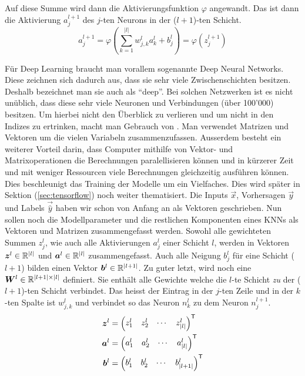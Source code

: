 Auf diese Summe wird dann die Aktivierungsfunktion $\varphi$ angewandt.
Das ist dann die Aktivierung $a_j^{l+1}$ des $j$-ten Neurons in der ($l+1$)-ten Schicht.
\\
\begin{equation}\tag{FP2}\label{eq:aktivierung_normal}
  a_j^{l+1} = \varphi\left(\sum_{k=1}^{|l|} w_{j,k}^l a_k^{l} + b_j^l \right) = \varphi \left( z_j^{l+1} \right)
\end{equation}
\par\bigskip
Für Deep Learning braucht man vorallem sogenannte Deep Neural Networks. Diese
zeichnen sich dadurch aus, dass sie sehr viele Zwischenschichten besitzen.
Deshalb bezeichnet man sie auch als ``deep''.
Bei solchen Netzwerken ist es nicht unüblich,
dass diese sehr viele Neuronen und Verbindungen (über 100'000) besitzen.
Um hierbei nicht den Überblick zu verlieren und um nicht in den Indizes zu
ertrinken, macht man Gebrauch von . Man verwendet
Matrizen und Vektoren um die vielen Variabeln zusammenzufassen.
Ausserdem besteht ein weiterer Vorteil darin, dass Computer mithilfe von Vektor-
und Matrixoperationen die Berechnungen paralellisieren können und in kürzerer
Zeit und mit weniger Ressourcen viele Berechnungen gleichzeitig ausführen können.
Dies beschleunigt das Training der Modelle um
ein Vielfaches. Dies wird später in Sektion
(\ref{sec:tensorflow}) noch weiter thematisiert.
\para{}
Die Inputs $\vec{x}$, Vorhersagen $\vec{y}$ und Labels $\vec{\hat{y}}$ haben wir schon von Anfang an als Vektoren geschrieben.
Nun sollen noch die Modellparameter und die restlichen Komponenten eines KNNs als Vektoren und Matrizen zusammengefasst werden.
Sowohl alle gewichteten Summen $z_j^l$, wie auch alle Aktivierungen $a_j^l$
einer Schicht $l$, werden in Vektoren $\bm{z}^l \in \mathbb{R}^{|l|}$ und
$\bm{a}^l \in \mathbb{R}^{|l|}$ zusammengefasst.
Auch alle Neigung $b_j^l$ für eine Schicht ($l+1$) bilden einen Vektor
$\bm{b}^l \in \mathbb{R}^{|l+1|}$.
\para{}
Zu guter letzt, wird noch eine  $\bm{W}^l \in
\mathbb{R}^{|l+1| \times |l|}$
definiert. Sie enthält alle Gewichte welche die $l$-te
Schicht \textit{zu} der ($l+1$)-ten Schicht verbindet.
Das heisst der Eintrag in der $j$-ten Zeile und in
der $k$-ten Spalte ist $w_{j,k}^l$ und verbindet so das Neuron $n_k^{l}$ zu
dem Neuron $n_j^{l+1}$.
\\
\begin{align*}
  \bm{z}^l &=  \begin{pmatrix} z_1^l & z_2^l & \cdots & z_{|l|}^l \end{pmatrix}^{\mathsf{T}} \\
  \bm{a}^l &=  \begin{pmatrix} a_1^l & a_2^l & \cdots & a_{|l|}^l \end{pmatrix}^{\mathsf{T}} \\
  \bm{b}^l &=  \begin{pmatrix} b_1^l & b_2^l & \cdots & b_{|l+1|}^l \end{pmatrix}^{\mathsf{T}} \\
\end{align*}
